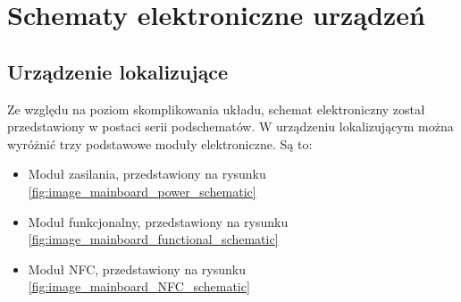 \chapter{Schematy elektroniczne urządzeń}
\label{schematics}

\section{Urządzenie lokalizujące}
Ze względu na poziom skomplikowania układu, schemat elektroniczny został przedstawiony w postaci serii podschematów. W urządzeniu lokalizującym można wyróżnić trzy podstawowe moduły elektroniczne. Są to:

\begin{itemize}
\item Moduł zasilania, przedstawiony na rysunku \ref{fig:image_mainboard_power_schematic}
\item Moduł funkcjonalny, przedstawiony na rysunku \ref{fig:image_mainboard_functional_schematic}
\item Moduł NFC, przedstawiony na rysunku \ref{fig:image_mainboard_NFC_schematic}
\end{itemize}


